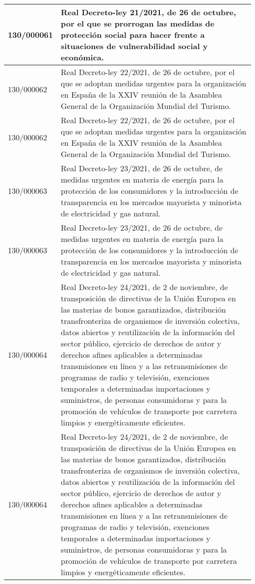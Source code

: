 {\begin{table}[H]
\begin{center}
\begin{tabularx}{\linewidth}{| l | X |}
\hline
130/000061 & Real Decreto-ley 21/2021, de 26 de octubre, por el que se prorrogan las medidas de protección social para hacer frente a situaciones de vulnerabilidad social y económica. \\
\hline
130/000062 & Real Decreto-ley 22/2021, de 26 de octubre, por el que se adoptan medidas urgentes para la organización en España de la XXIV reunión de la Asamblea General de la Organización Mundial del Turismo. \\
\hline
130/000062 & Real Decreto-ley 22/2021, de 26 de octubre, por el que se adoptan medidas urgentes para la organización en España de la XXIV reunión de la Asamblea General de la Organización Mundial del Turismo. \\
\hline
130/000063 & Real Decreto-ley 23/2021, de 26 de octubre, de medidas urgentes en materia de energía para la protección de los consumidores y la introducción de transparencia en los mercados mayorista y minorista de electricidad y gas natural. \\
\hline
130/000063 & Real Decreto-ley 23/2021, de 26 de octubre, de medidas urgentes en materia de energía para la protección de los consumidores y la introducción de transparencia en los mercados mayorista y minorista de electricidad y gas natural. \\
\hline
130/000064 & Real Decreto-ley 24/2021, de 2 de noviembre, de transposición de directivas de la Unión Europea en las materias de bonos garantizados, distribución transfronteriza de organismos de inversión colectiva, datos abiertos y reutilización de la información del sector público, ejercicio de derechos de autor y derechos afines aplicables a determinadas transmisiones en línea y a las retransmisiones de programas de radio y televisión, exenciones temporales a determinadas importaciones y suministros, de personas consumidoras y para la promoción de vehículos de transporte por carretera limpios y energéticamente eficientes. \\
\hline
130/000064 & Real Decreto-ley 24/2021, de 2 de noviembre, de transposición de directivas de la Unión Europea en las materias de bonos garantizados, distribución transfronteriza de organismos de inversión colectiva, datos abiertos y reutilización de la información del sector público, ejercicio de derechos de autor y derechos afines aplicables a determinadas transmisiones en línea y a las retransmisiones de programas de radio y televisión, exenciones temporales a determinadas importaciones y suministros, de personas consumidoras y para la promoción de vehículos de transporte por carretera limpios y energéticamente eficientes. \\

\end{tabularx}
\end{center}
\end{table}}
